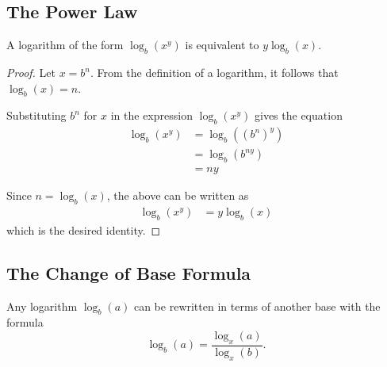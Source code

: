\documentclass[parskip, headings=standardclasses]{scrartcl}
\begin{document}
\subsection{The Power Law}

\begin{theorem}
  A logarithm of the form \(\log_{b}(x^{y})\) is equivalent to \(y
  \log_{b}(x)\).
\end{theorem}

\begin{proof}
  Let \(x = b^{n}\). From the definition of a logarithm, it follows that
  \(\log_{b}(x) = n\).

  Substituting \(b^{n}\) for \(x\) in the expression \(\log_{b}(x^{y})\) gives
  the equation
  \begin{equation*}
    \begin{split}
      \log_{b}(x^{y}) &= \log_{b}({(b^{n})}^{y}) \\
      &= \log_{b}(b^{ny}) \\
      &= ny
    \end{split}
  \end{equation*}

  Since \(n = \log_{b}(x)\), the above can be written as
  \begin{equation*}
    \begin{split}
      \log_{b}(x^{y}) &= y\log_{b}(x)
    \end{split}
  \end{equation*}
  which is the desired identity.
\end{proof}

\subsection{The Change of Base Formula}

\begin{theorem}
  Any logarithm \(\log_{b}(a)\) can be rewritten in terms of another base with
  the formula
  \[ \log_{b}(a) = \frac{\log_{x}(a)}{\log_{x}(b)}. \]
\end{theorem}
\end{document}
